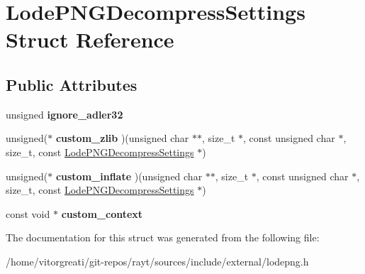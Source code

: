 \hypertarget{struct_lode_p_n_g_decompress_settings}{}\section{Lode\+P\+N\+G\+Decompress\+Settings Struct Reference}
\label{struct_lode_p_n_g_decompress_settings}
\subsection*{Public Attributes}
\begin{DoxyCompactItemize}
\item 
\mbox{\label{struct_lode_p_n_g_decompress_settings_afab4b919650b51b4d2f175a60ed6c580}} 
unsigned {\bfseries ignore\+\_\+adler32}
\item 
\mbox{\label{struct_lode_p_n_g_decompress_settings_a9dd432e46330dbd2ce3ef1929c64337d}} 
unsigned($\ast$ {\bfseries custom\+\_\+zlib} )(unsigned char $\ast$$\ast$, size\+\_\+t $\ast$, const unsigned char $\ast$, size\+\_\+t, const \mbox{\hyperlink{struct_lode_p_n_g_decompress_settings}{Lode\+P\+N\+G\+Decompress\+Settings}} $\ast$)
\item 
\mbox{\label{struct_lode_p_n_g_decompress_settings_a023aa5946c99934d40280850a4d8b204}} 
unsigned($\ast$ {\bfseries custom\+\_\+inflate} )(unsigned char $\ast$$\ast$, size\+\_\+t $\ast$, const unsigned char $\ast$, size\+\_\+t, const \mbox{\hyperlink{struct_lode_p_n_g_decompress_settings}{Lode\+P\+N\+G\+Decompress\+Settings}} $\ast$)
\item 
\mbox{\label{struct_lode_p_n_g_decompress_settings_a66e3608b541c64bb275c0ac1a80c3ec6}} 
const void $\ast$ {\bfseries custom\+\_\+context}
\end{DoxyCompactItemize}


The documentation for this struct was generated from the following file\+:\begin{DoxyCompactItemize}
\item 
/home/vitorgreati/git-\/repos/rayt/sources/include/external/lodepng.\+h\end{DoxyCompactItemize}
